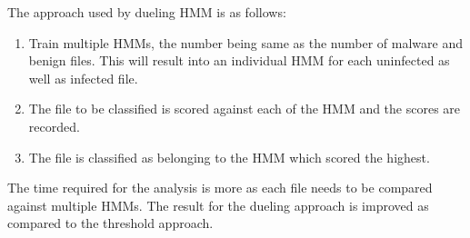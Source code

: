 The approach used by dueling HMM is as follows:
\begin{enumerate}
\item Train multiple HMMs, the number being same as the number of malware and benign files. This will result into an individual HMM for each uninfected as well as infected file. 
\item The file to be classified is scored against each of the HMM and the scores are recorded.
\item The file is classified as belonging to the HMM which scored the highest.
\end{enumerate}

The time required for the analysis is more as each file needs to be compared against multiple HMMs. The result for the dueling approach is improved as compared to the threshold approach. 